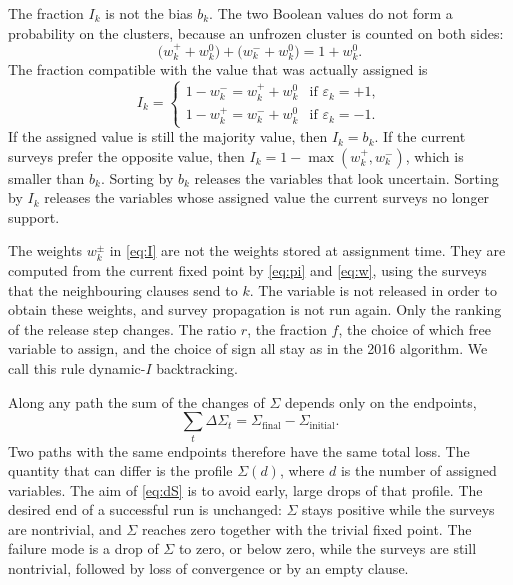 \documentclass[11pt]{article}
\begin{document}
The fraction $I_k$ is not the bias $b_k$. The two Boolean values do not form a probability on the clusters, because an unfrozen cluster is counted on both sides:
\begin{equation}
\bigl(w^+_k+w^0_k\bigr)+\bigl(w^-_k+w^0_k\bigr)
=
1+w^0_k.
\label{eq:not-prob}
\end{equation}
The fraction compatible with the value that was actually assigned is
\begin{equation}
I_k
=
\begin{cases}
1-w^-_k = w^+_k+w^0_k & \text{if }\varepsilon_k=+1,\\
1-w^+_k = w^-_k+w^0_k & \text{if }\varepsilon_k=-1.
\end{cases}
\label{eq:I}
\end{equation}
If the assigned value is still the majority value, then $I_k=b_k$. If the current surveys prefer the opposite value, then $I_k=1-\max(w^+_k,w^-_k)$, which is smaller than $b_k$. Sorting by $b_k$ releases the variables that look uncertain. Sorting by $I_k$ releases the variables whose assigned value the current surveys no longer support.

The weights $w^{\pm}_k$ in \eqref{eq:I} are not the weights stored at assignment time. They are computed from the current fixed point by \eqref{eq:pi} and \eqref{eq:w}, using the surveys that the neighbouring clauses send to $k$. The variable is not released in order to obtain these weights, and survey propagation is not run again. Only the ranking of the release step changes. The ratio $r$, the fraction $f$, the choice of which free variable to assign, and the choice of sign all stay as in the 2016 algorithm. We call this rule dynamic-$I$ backtracking.

Along any path the sum of the changes of $\Sigma$ depends only on the endpoints,
\begin{equation}
\sum_t \Delta\Sigma_t
=
\Sigma_{\mathrm{final}}-\Sigma_{\mathrm{initial}}.
\label{eq:telescope}
\end{equation}
Two paths with the same endpoints therefore have the same total loss. The quantity that can differ is the profile $\Sigma(d)$, where $d$ is the number of assigned variables. The aim of \eqref{eq:dS} is to avoid early, large drops of that profile. The desired end of a successful run is unchanged: $\Sigma$ stays positive while the surveys are nontrivial, and $\Sigma$ reaches zero together with the trivial fixed point. The failure mode is a drop of $\Sigma$ to zero, or below zero, while the surveys are still nontrivial, followed by loss of convergence or by an empty clause.
\end{document}
